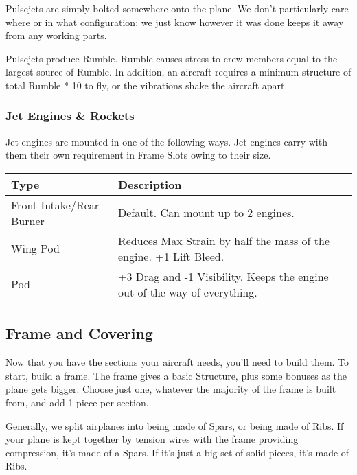 \documentclass{article}
\begin{document}
Pulsejets are simply bolted somewhere onto the plane. We don't
particularly care where or in what configuration: we just know however
it was done keeps it away from any working parts.

Pulsejets produce Rumble. Rumble causes stress to crew members equal to
the largest source of Rumble. In addition, an aircraft requires a
minimum structure of total Rumble * 10 to fly, or the vibrations shake
the aircraft apart.

\subsubsection{Jet Engines \& Rockets}
\label{_Jet_Engines_\&_Rockets}

Jet engines are mounted in one of the following ways. Jet engines carry
with them their own requirement in Frame Slots owing to their size.

\begin{tabular}{|l|l|}
  \hline
  Type                     & Description                                                   \\\hline
  Front Intake/Rear Burner & Default. Can mount up to 2 engines.                           \\\hline
  Wing Pod                 & Reduces Max Strain by half the mass of the engine. +1 Lift
  Bleed.                                                                                   \\\hline
  Pod                      & +3 Drag and -1 Visibility. Keeps the engine out of the way of
  everything.                                                                              \\\hline
\end{tabular}

\subsection{Frame and Covering}
\label{_Frame_and_Covering}

Now that you have the sections your aircraft needs, you'll need to build
them. To start, build a frame. The frame gives a basic Structure, plus
some bonuses as the plane gets bigger. Choose just one, whatever the
majority of the frame is built from, and add 1 piece per section.

Generally, we split airplanes into being made of Spars, or being made of
Ribs. If your plane is kept together by tension wires with the frame
providing compression, it's made of a Spars. If it's just a big set of
solid pieces, it's made of Ribs.
\end{document}
